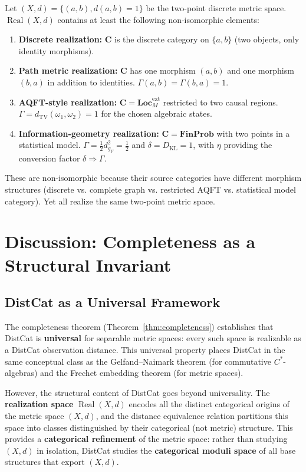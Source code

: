 \documentclass[11pt,a4paper]{article}
\begin{document}
\begin{example}
Let $(X,d)=\{(a,b),d(a,b)=1\}$ be the two-point discrete metric space.
$\operatorname{Real}(X,d)$ contains at least the following non-isomorphic elements:
\begin{enumerate}
\item \textbf{Discrete realization:} $\mathbf{C}$ is the discrete category on $\{a,b\}$ (two objects, only identity morphisms).
\item \textbf{Path metric realization:} $\mathbf{C}$ has one morphism $(a,b)$ and one morphism $(b,a)$ in addition to identities. $\Gamma(a,b)=\Gamma(b,a)=1$.
\item \textbf{AQFT-style realization:} $\mathbf{C}=\mathbf{Loc}_M^{\mathrm{ext}}$ restricted to two causal regions. $\Gamma=d_{\mathrm{TV}}(\omega_1,\omega_2)=1$ for the chosen algebraic states.
\item \textbf{Information-geometry realization:} $\mathbf{C}=\mathbf{FinProb}$ with two points in a statistical model. $\Gamma=\frac{1}{2}d_{g_F}^2=\frac{1}{2}$ and $\delta=D_{\mathrm{KL}}=1$, with $\eta$ providing the conversion factor $\delta\Rightarrow\Gamma$.
\end{enumerate}
These are non-isomorphic because their source categories have different
morphism structures (discrete vs. complete graph vs. restricted AQFT vs.
statistical model category). Yet all realize the same two-point metric space.
\end{example}

\section{Discussion: Completeness as a Structural Invariant}

\subsection{DistCat as a Universal Framework}

The completeness theorem (Theorem~\ref{thm:completeness}) establishes that
DistCat is \textbf{universal} for separable metric spaces: every such space
is realizable as a DistCat observation distance. This universal property
places DistCat in the same conceptual class as the Gelfand--Naimark theorem
(for commutative $C^*$-algebras) and the Frechet embedding theorem (for
metric spaces).

However, the structural content of DistCat goes beyond universality.
The \textbf{realization space} $\operatorname{Real}(X,d)$ encodes all the
distinct categorical origins of the metric space $(X,d)$, and the distance
equivalence relation partitions this space into classes distinguished by
their categorical (not metric) structure. This provides a
\textbf{categorical refinement} of the metric space: rather than studying
$(X,d)$ in isolation, DistCat studies the \textbf{categorical moduli space}
of all base structures that export $(X,d)$.
\end{document}
